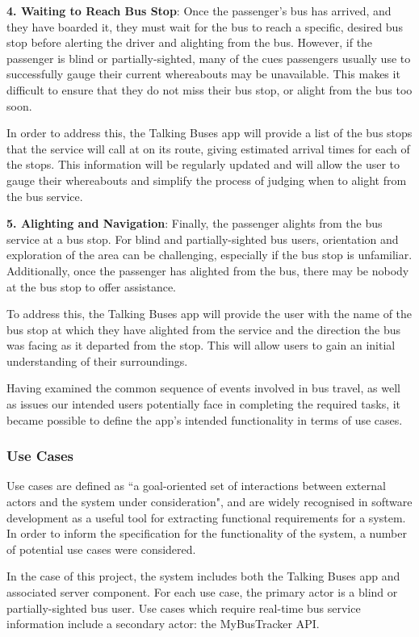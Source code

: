 \documentclass[10pt,twocolumn]{article}
\newcommand{\citep}[1]{}
\begin{document}
\textbf{4. Waiting to Reach Bus Stop}:
Once the passenger's bus has arrived, and they have boarded it, they must wait for the bus to reach a specific, desired bus stop before alerting the driver and alighting from the bus. However, if the passenger is blind or partially-sighted, many of the cues passengers usually use to successfully gauge their current whereabouts may be unavailable. This makes it difficult to ensure that they do not miss their bus stop, or alight from the bus too soon.

In order to address this, the Talking Buses app will provide a list of the bus stops that the service will call at on its route, giving estimated arrival times for each of the stops. This information will be regularly updated and will allow the user to gauge their whereabouts and simplify the process of judging when to alight from the bus service.

\textbf{5. Alighting and Navigation}:
Finally, the passenger alights from the bus service at a bus stop. For blind and partially-sighted bus users, orientation and exploration of the area can be challenging, especially if the bus stop is unfamiliar. Additionally, once the passenger has alighted from the bus, there may be nobody at the bus stop to offer assistance.

To address this, the Talking Buses app will provide the user with the name of the bus stop at which they have alighted from the service and the direction the bus was facing as it departed from the stop. This will allow users to gain an initial understanding of their surroundings.

Having examined the common sequence of events involved in bus travel, as well as issues our intended users potentially face in completing the required tasks, it became possible to define the app's intended functionality in terms of use cases.

\subsubsection{Use Cases}
\label{sec:useCases}
Use cases are defined as ``a goal-oriented set of interactions between external actors and the system under consideration", and are widely recognised in software development as a useful tool for extracting functional requirements for a system\citep{useCases}.  In order to inform the specification for the functionality of the system, a number of potential use cases were considered.

In the case of this project, the system includes both the Talking Buses app and associated server component.  For each use case, the primary actor is a blind or partially-sighted bus user. Use cases which require real-time bus service information include a secondary actor: the MyBusTracker API.
\end{document}
